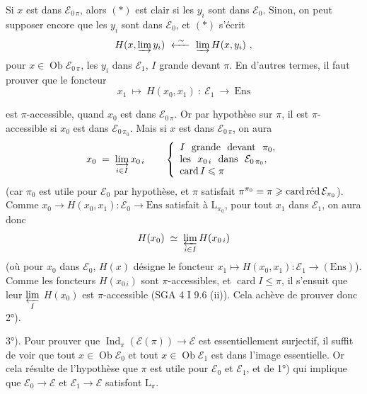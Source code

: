 \documentclass[11pt]{article}
\newcommand{\printedpage}[1]{\marginpar{\footnotesize p.~#1}}
\newcommand{\msp}[1]{\marginpar{\footnotesize [#1]}}
\newcommand{\Ob}{\operatorname{Ob}}
\newcommand{\card}{\operatorname{card}}
\DeclareMathOperator{\Ind}{Ind}
\newcommand{\cardred}{\mathop{\textup{card\,réd}}\nolimits}
\newcommand{\Ens}{\mathrm{Ens}}
\newcommand{\cE}{\mathcal{E}}
\begin{document}
Si $x$ est dans $\mathcal{E}_{0\,\pi}$, alors $(*)$ est clair si les $y_i$ sont dans $\mathcal{E}_0$. Sinon, on peut supposer encore que les $y_i$ sont dans $\mathcal{E}_0$, et $(*)$ s'écrit %
\[
H(x,\varinjlim y_i)\ \xleftarrow{\ \sim\ }\ \varinjlim H(x,y_i)\ ,
\]
pour $x\in\Ob\mathcal{E}_{0\,\pi}$, les $y_i$ dans $\mathcal{E}_1$, $I$ grande devant $\pi$. En d'autres termes, il faut prouver que le foncteur
\[
x_1\ \longmapsto\ H(x_0,x_1)\ :\ \mathcal{E}_1\ \longrightarrow\ \Ens
\]

\setcounter{footnote}{174}

\printedpage{159}

\msp{page 419}
est $\pi$-accessible, quand $x_0$ est dans $\cE_{0\,\pi}$. Or par hypothèse sur $\pi$, il est $\pi$-accessible si $x_0$ est dans $\cE_{0\,\pi_0}$. Mais si $x$ est dans $\cE_{0\,\pi}$, on aura %
\[
x_0 \;=\; \varinjlim_{i\in I} x_{0\,i} \qquad
\left\{
\begin{array}{l}
I\ \ \text{grande}\ \ \text{devant}\ \ \pi_0,\\
\text{les}\ \ x_{0\,i}\ \ \text{dans}\ \ \cE_{0\,\pi_0},\\
\card I \leqslant \pi
\end{array}
\right.
\]
(car $\pi_0$ est utile pour $\cE_0$ par hypothèse, et $\pi$ satisfait $\pi^{\pi_0} = \pi \geqslant \cardred \cE_{\pi_0}$). Comme $x_0 \longrightarrow H(x_0,x_1) : \cE_0 \longrightarrow \Ens$ satisfait à $\mathrm{L}_{\pi_0}$, pour tout $x_1$ dans $\cE_1$, on aura donc %
\[
H(x_0) \;\simeq\; \varprojlim_{i\in I} H(x_{0\,i})
\]
(où pour $x_0$ dans $\cE_0$, $H(x)$ désigne le foncteur $x_1 \longmapsto H(x_0,x_1) : \cE_1 \longrightarrow (\Ens)$). Comme %
les foncteurs $H(x_{0\,i})$ sont $\pi$-accessibles, et $\card I \leqslant \pi$, il s'ensuit que leur $\varprojlim\limits_{I}$ $H(x_0)$ est $\pi$-accessible (SGA 4 I 9.6 (ii)). Cela achève de prouver donc 2°).

3°). Pour prouver que $\Ind_\pi(\cE(\pi)) \longrightarrow \cE$ est essentiellement surjectif, il suffit de voir que tout $x \in \Ob\cE_0$ et tout $x \in \Ob\cE_1$
\msp{page 420}
est dans l'image essentielle. Or cela résulte de l'hypothèse que $\pi$ est utile pour $\cE_0$ et $\cE_1$, et de 1°) qui implique que $\cE_0 \longrightarrow \cE$ et $\cE_1 \longrightarrow \cE$ satisfont $\mathrm{L}_\pi$.
\end{document}
